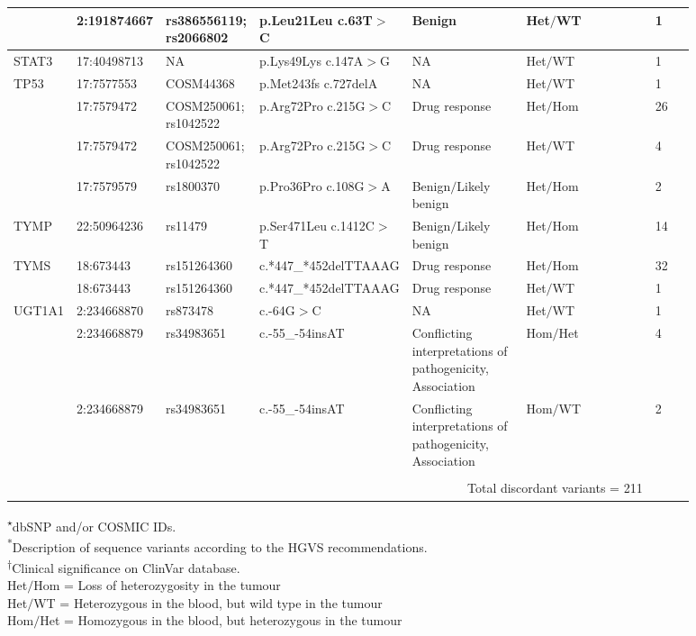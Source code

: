 \begin{landscape}
\begin{longtable}{p{0.09\linewidth}|p{0.1\linewidth}p{0.12\linewidth}p{0.14\linewidth}p{0.17\linewidth}p{0.2\linewidth}p{0.06\linewidth}}
		\\
		& 2:191874667 & rs386556119; rs2066802 & p.Leu21Leu c.63T$>$C & Benign & Het$/$WT & 1
		\\
		\hline
		STAT3 & 17:40498713 & NA & p.Lys49Lys c.147A$>$G & NA & Het$/$WT & 1
		\\
		\hline
		TP53 & 17:7577553 & COSM44368 & p.Met243fs c.727delA & NA & Het$/$WT & 1
		\\
		& 17:7579472 & COSM250061; rs1042522 & p.Arg72Pro c.215G$>$C & Drug response & Het$/$Hom & 26
		\\
		& 17:7579472 & COSM250061; rs1042522 & p.Arg72Pro c.215G$>$C & Drug response & Het$/$WT & 4
		\\
		& 17:7579579 & rs1800370 & p.Pro36Pro c.108G$>$A & Benign$/$Likely benign & Het$/$Hom & 2
		\\
		\hline
		TYMP & 22:50964236 & rs11479 & p.Ser471Leu c.1412C$>$T & Benign$/$Likely benign & Het$/$Hom & 14
		\\
		\hline
		TYMS & 18:673443 & rs151264360 & \footnotesize{c.*447\_*452delTTAAAG} & Drug response & Het$/$Hom & 32
		\\
		& 18:673443 & rs151264360 & \footnotesize{c.*447\_*452delTTAAAG} & Drug response & Het$/$WT & 1
		\\
		\hline
		UGT1A1 & 2:234668870 & rs873478 & c.-64G$>$C & NA & Het$/$WT & 1
		\\
		& 2:234668879 & rs34983651 & c.-55\_-54insAT & Conflicting interpretations of pathogenicity, Association & Hom$/$Het & 4
		\\
		& 2:234668879 & rs34983651 & c.-55\_-54insAT & Conflicting interpretations of pathogenicity, Association & Hom$/$WT & 2
		\\
		\hline
		\\
		&
		\multicolumn{5}{r}{Total discordant variants = 211}
		&
		\\
		\hline
\end{longtable}

\noindent\textsuperscript{$\star$}dbSNP and/or COSMIC IDs.
\\
\textsuperscript{*}Description of sequence variants according to the HGVS recommendations.
\\
\textsuperscript{$\dagger$}Clinical significance on ClinVar database.
\\
Het$/$Hom = Loss of heterozygosity in the tumour
\\
Het$/$WT = Heterozygous in the blood, but wild type in the tumour
\\
Hom$/$Het = Homozygous in the blood, but heterozygous in the tumour

\end{landscape}

